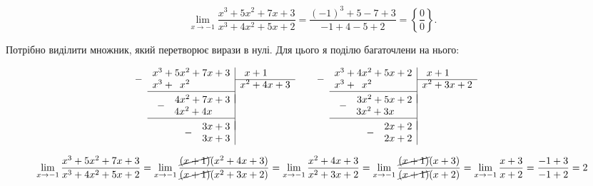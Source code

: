\documentclass[../rgr1.tex]{subfiles}
\begin{document}
\Solution

\begin{equation}
	\lim_{x\to-1}\frac{x^3+5x^2+7x+3}{x^3+4x^2+5x+2} =
	\frac{(-1)^3+5-7+3}{-1+4-5+2} =
	\left\{ \frac{0}{0} \right\}.
\end{equation}

Потрібно виділити множник, який перетворює вирази в нулі. Для цього я поділю багаточлени на нього:

\newcommand{\dropsign}[1]{\smash{\llap{\raisebox{-.5\normalbaselineskip}{$#1$\hspace{2\arraycolsep}}}}}%

\begin{equation}
  \begin{array}{r|r}
	\dropsign{-}
	  	x^3 + 5x^2 + 7x + 3	& x + 1 \phantom{x + 3} \\ \cline{2-2}
		x^3 + \phantom{0} x^2 \phantom{{x}+0+0}	& x^2 + 4x + 3 \\ \cline{1-1} \\[\dimexpr-\normalbaselineskip+\jot]
	\dropsign{-}
	  	4x^2 + 7x + 3		\\
		4x^2 + 4x \phantom{+30}	\\ \cline{1-1} \\[\dimexpr-\normalbaselineskip+\jot]
	\dropsign{-}
		3x + 3 \\
		3x + 3 \\
  \end{array}
	\phantom{xxxxxx}
  \begin{array}{r|r}
	\dropsign{-}
	  	x^3 + 4x^2 + 5x + 2	& x + 1 \phantom{x+2} \\ \cline{2-2}
		x^3 + \phantom{0} x^2 \phantom{{x}+0+0}	& x^2 + 3x + 2 \\ \cline{1-1} \\[\dimexpr-\normalbaselineskip+\jot]
	\dropsign{-}
	  	3x^2 + 5x + 2		\\
		3x^2 + 3x \phantom{+30}	\\ \cline{1-1} \\[\dimexpr-\normalbaselineskip+\jot]
	\dropsign{-}
		2x + 2 \\
		2x + 2 \\
  \end{array}
\end{equation}

\begin{dmath}
	\lim_{x\to-1}\frac{x^3+5x^2+7x+3}{x^3+4x^2+5x+2} =
	\lim_{x\to-1}\frac{ \cancel{(x+1)} (x^2+4x+3)}{ \cancel{(x+1)} (x^2+3x+2)} =
	\lim_{x\to-1}\frac{x^2+4x+3}{x^2+3x+2} =
	\lim_{x\to-1}\frac{ \cancel{(x+1)} (x+3)}{ \cancel{(x+1)} (x+2)} =
	\lim_{x\to-1}\frac{x+3}{x+2} =
	\frac{-1+3}{-1+2} = 2
\end{dmath}
\end{document}
